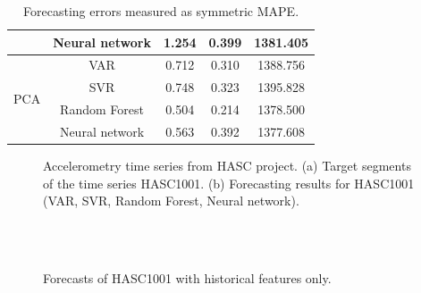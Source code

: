 \documentclass[conference]{IEEEtran}
\begin{document}
\begin{table}
\begin{tabular}{|c|c|c|c|c|}
\cline{2-5}
 &Neural network &   1.254 &    0.399 &    1381.405\\
\cline{2-5}
\hline
\multirow{4}{*}{PCA} &VAR &   0.712 &    0.310 &    1388.756\\
\cline{2-5}
 &SVR &   0.748 &    0.323 &    1395.828\\
\cline{2-5}
 &Random Forest &   0.504 &    0.214 &    1378.500\\
\cline{2-5}
 &Neural network &   0.563 &    0.392 &    1377.608\\
\cline{2-5}
\hline
\end{tabular}
\caption{Forecasting errors measured as symmetric MAPE.}
\label{fg:feature_selection_res_HASC1}
\end{table}


\begin{figure}
\centering
\caption{Accelerometry time series from HASC project. 
(a) Target segments of the time series HASC1001. (b) Forecasting results for	HASC1001 (VAR, SVR, Random Forest, Neural network).}
\end{figure}

\begin{figure}
\centering
{}
\\
\\
\caption{Forecasts of HASC1001 with historical features only.}
\end{figure}

\end{document}
